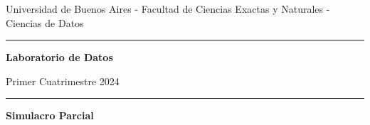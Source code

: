 \documentclass[12pt]{article}
\begin{document}
\centerline{{\small Universidad de Buenos Aires - Facultad de Ciencias Exactas y Naturales - Ciencias de Datos}}

\vskip 0.2cm

\hrule

\vskip 0.2cm

 \centerline{{\bf\Large{\sc Laboratorio de Datos}}}

 \vskip 0.2cm

 \centerline{\ttfamily Primer Cuatrimestre 2024}

\vskip 0.2cm

 \hrule

 \bigskip
 \centerline{\bf Simulacro Parcial}
 \bigskip


\thispagestyle{plain}




%
%
%


\end{document}
